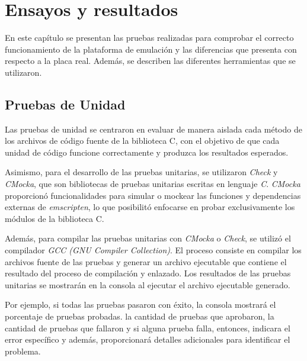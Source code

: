 
\chapter{Ensayos y resultados} %

\label{Chapter4} %

En este capítulo se presentan las pruebas realizadas para comprobar el correcto funcionamiento de la plataforma de emulación y las diferencias que presenta con respecto a la placa real. Además, se describen las diferentes herramientas que se utilizaron.

\section{Pruebas de Unidad} 
\label{subsec:Pruebas de Unidad}  

Las pruebas de unidad se centraron en evaluar de manera aislada cada método de los archivos de código fuente de la biblioteca C, con el objetivo de que cada unidad de código funcione correctamente y produzca los resultados esperados. 

Asimismo, para el desarrollo de las pruebas unitarias, se utilizaron \textit{Check} y \textit{CMocka}, que son bibliotecas de pruebas unitarias escritas en lenguaje \textit{C}. \textit{CMocka} proporcionó funcionalidades para simular o mockear las funciones y dependencias externas de \textit{emscripten}, lo que posibilitó enfocarse en probar exclusivamente los módulos de la biblioteca C.

Además, para compilar las pruebas unitarias con \textit{CMocka} o \textit{Check}, se utilizó el compilador \textit{GCC (GNU Compiler Collection)}. El proceso consiste en compilar los archivos fuente de las pruebas y generar un archivo ejecutable que contiene el resultado del proceso de compilación y enlazado. Los resultados de las pruebas unitarias se mostrarán en la consola al ejecutar el archivo ejecutable generado.

Por ejemplo, si todas las pruebas pasaron con éxito, la consola mostrará el porcentaje de pruebas probadas. la cantidad de pruebas que aprobaron, la cantidad de pruebas que fallaron y si alguna prueba falla, entonces, indicara el error específico y además, proporcionará detalles adicionales para identificar el problema.

